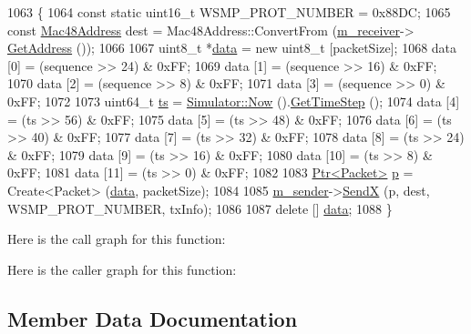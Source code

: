 \begin{DoxyCode}
1063 \{
1064   \textcolor{keyword}{const} \textcolor{keyword}{static} uint16\_t WSMP\_PROT\_NUMBER = 0x88DC;
1065   \textcolor{keyword}{const} \hyperlink{classns3_1_1Mac48Address}{Mac48Address} dest = Mac48Address::ConvertFrom (\hyperlink{classAnnexC__TestCase_a510f45570e19a81906b9de2c586b89f7}{m\_receiver}->
      \hyperlink{classns3_1_1WaveNetDevice_a26fc24872a196373d69b21615514a758}{GetAddress} ());
1066 
1067   uint8\_t *\hyperlink{topology-example-sim_8cc_a26c65296e316af77b787dc77469bb2a4}{data} = \textcolor{keyword}{new} uint8\_t [packetSize];
1068   data [0] = (sequence >> 24) & 0xFF;
1069   data [1] = (sequence >> 16) & 0xFF;
1070   data [2] = (sequence >> 8) & 0xFF;
1071   data [3] = (sequence >> 0) & 0xFF;
1072 
1073   uint64\_t \hyperlink{lte_2model_2fading-traces_2fading__trace__generator_8m_ada841f58d7be618bfbc76c87e7d44086}{ts} = \hyperlink{group__simulator_gac3635e2e87f7ce316c89290ee1b01d0d}{Simulator::Now} ().\hyperlink{classns3_1_1Time_a40a7025b73dac7d02f8a4e1e54eaa5b5}{GetTimeStep} ();
1074   data [4] = (ts >> 56) & 0xFF;
1075   data [5] = (ts >> 48) & 0xFF;
1076   data [6] = (ts >> 40) & 0xFF;
1077   data [7] = (ts >> 32) & 0xFF;
1078   data [8] = (ts >> 24) & 0xFF;
1079   data [9] = (ts >> 16) & 0xFF;
1080   data [10] = (ts >> 8) & 0xFF;
1081   data [11] = (ts >> 0) & 0xFF;
1082 
1083   \hyperlink{classns3_1_1Ptr}{Ptr<Packet>} \hyperlink{lte__link__budget_8m_ac9de518908a968428863f829398a4e62}{p} = Create<Packet> (\hyperlink{topology-example-sim_8cc_a26c65296e316af77b787dc77469bb2a4}{data}, packetSize);
1084 
1085   \hyperlink{classAnnexC__TestCase_a277f353900b6dbe1e7850814b9f26cdb}{m\_sender}->\hyperlink{classns3_1_1WaveNetDevice_a99ec2b781006c6011a9667e064843b38}{SendX}  (p, dest, WSMP\_PROT\_NUMBER, txInfo);
1086 
1087   \textcolor{keyword}{delete} [] \hyperlink{topology-example-sim_8cc_a26c65296e316af77b787dc77469bb2a4}{data};
1088 \}
\end{DoxyCode}


Here is the call graph for this function\+:




Here is the caller graph for this function\+:




\subsection{Member Data Documentation}
